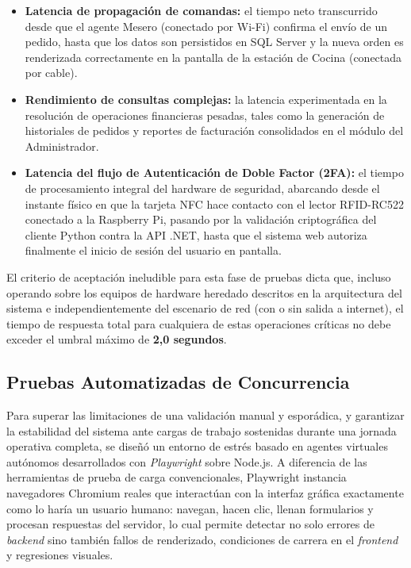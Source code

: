 \begin{itemize}
	\item \textbf{Latencia de propagación de comandas:} el tiempo neto transcurrido desde que el agente Mesero (conectado por Wi-Fi) confirma el envío de un pedido, hasta que los datos son persistidos en SQL Server y la nueva orden es renderizada correctamente en la pantalla de la estación de Cocina (conectada por cable).
	\item \textbf{Rendimiento de consultas complejas:} la latencia experimentada en la resolución de operaciones financieras pesadas, tales como la generación de historiales de pedidos y reportes de facturación consolidados en el módulo del Administrador.
	\item \textbf{Latencia del flujo de Autenticación de Doble Factor (2FA):} el tiempo de procesamiento integral del hardware de seguridad, abarcando desde el instante físico en que la tarjeta NFC hace contacto con el lector RFID-RC522 conectado a la Raspberry Pi, pasando por la validación criptográfica del cliente Python contra la API .NET, hasta que el sistema web autoriza finalmente el inicio de sesión del usuario en pantalla.
\end{itemize}

El criterio de aceptación ineludible para esta fase de pruebas dicta que, incluso operando sobre los equipos de hardware heredado descritos en la arquitectura del sistema e independientemente del escenario de red (con o sin salida a internet), el tiempo de respuesta total para cualquiera de estas operaciones críticas no debe exceder el umbral máximo de \textbf{2,0 segundos}.

\subsection{Pruebas Automatizadas de Concurrencia}

Para superar las limitaciones de una validación manual y esporádica, y garantizar la estabilidad del sistema ante cargas de trabajo sostenidas durante una jornada operativa completa, se diseñó un entorno de estrés basado en agentes virtuales autónomos desarrollados con \textit{Playwright} sobre Node.js. A diferencia de las herramientas de prueba de carga convencionales, Playwright instancia navegadores Chromium reales que interactúan con la interfaz gráfica exactamente como lo haría un usuario humano: navegan, hacen clic, llenan formularios y procesan respuestas del servidor, lo cual permite detectar no solo errores de \textit{backend} sino también fallos de renderizado, condiciones de carrera en el \textit{frontend} y regresiones visuales.

